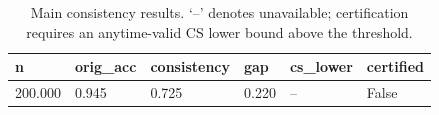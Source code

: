 \begin{table}[t]
\centering
\begin{tabular}{llllll}
\toprule
n & orig_acc & consistency & gap & cs_lower & certified \\
\midrule
200.000 & 0.945 & 0.725 & 0.220 & -- & False \\
\bottomrule
\end{tabular}
\caption{Main consistency results. `--' denotes unavailable; certification requires an anytime-valid CS lower bound above the threshold.}
\end{table}
